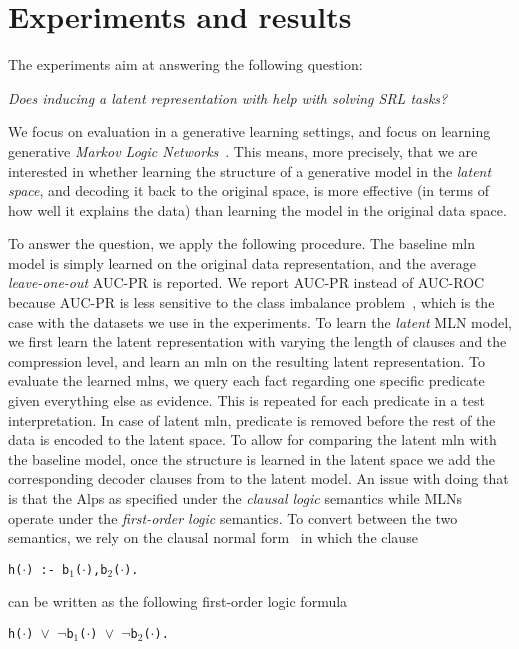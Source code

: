 \section{Experiments and results}



The experiments aim at answering the following question:

\begin{displayquote}
\textit{Does inducing a latent  representation with  help with solving SRL tasks?}
\end{displayquote}

We focus on evaluation in a generative learning settings, and focus on learning generative \textit{Markov Logic Networks}~\cite{Richardson2006}.
This means, more precisely, that we are interested in whether learning the structure of a generative model in the \textit{latent space}, and decoding it back to the original space, is more effective (in terms of how well it explains the data) than learning the model in the original data space.


To answer the question, we apply the following procedure.
The baseline \gls{mln} model is simply learned on the original data representation, and the average \textit{leave-one-out} AUC-PR is reported.
We report AUC-PR instead of AUC-ROC because AUC-PR is less sensitive to the class imbalance problem~\cite{Davis:2006:RPR:1143844.1143874}, which is the case with the datasets we use in the experiments.
To learn the \textit{latent} MLN model, we first learn the latent representation with  varying the length of clauses and the compression level, and learn an \gls{mln} on the resulting latent representation.
To evaluate the learned \gls{mln}s, we query each fact regarding one specific predicate given everything else as evidence.
This is repeated for each predicate in a test interpretation.
In case of latent \gls{mln}, predicate is removed before the rest of the data is encoded to the latent space.
To allow for comparing the latent \gls{mln} with the baseline model, once the structure is learned in the latent space we add the corresponding decoder clauses from  to the latent model.
An issue with doing that is that the Alps as specified under the \textit{clausal logic} semantics  while MLNs operate under the \textit{first-order logic} semantics.
To convert between the two semantics, we rely on the clausal normal form~\cite{VanEmden:1976:SPL:321978.321991,Russell:2009:AIM:1671238,Jackson:2004:CFC:2103144.2103160} in which the clause
\begin{center}
	\texttt{h($\cdot$) :- b$_1$($\cdot$),b$_2$($\cdot$).}
\end{center}
can be written as the following first-order logic formula
\begin{center}
	\texttt{h($\cdot$) $\vee$ $\neg$b$_1$($\cdot$) $\vee$ $\neg$b$_2$($\cdot$).}
\end{center}

